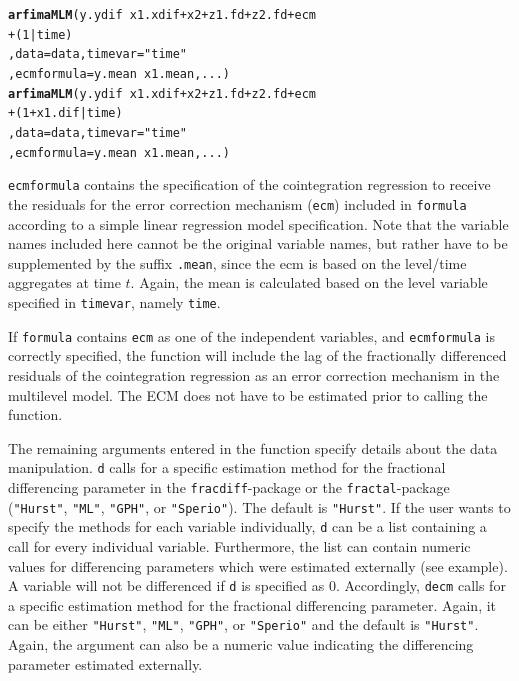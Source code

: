 \documentclass[12pt]{paper}\usepackage[]{graphicx}\usepackage[]{color}
\makeatletter
\newcommand{\hlnum}[1]{\textcolor[rgb]{0.686,0.059,0.569}{#1}}%
\newcommand{\hlstr}[1]{\textcolor[rgb]{0.192,0.494,0.8}{#1}}%
\newcommand{\hlopt}[1]{\textcolor[rgb]{0,0,0}{#1}}%
\newcommand{\hlstd}[1]{\textcolor[rgb]{0.345,0.345,0.345}{#1}}%
\newcommand{\hlkwc}[1]{\textcolor[rgb]{0.333,0.667,0.333}{#1}}%
\newcommand{\hlkwd}[1]{\textcolor[rgb]{0.737,0.353,0.396}{\textbf{#1}}}%
\newenvironment{kframe}{%
 \def\at@end@of@kframe{}%
 \ifinner\ifhmode%
  \def\at@end@of@kframe{\end{minipage}}%
  \begin{minipage}{\columnwidth}%
 \fi\fi%
 \def\FrameCommand##1{\hskip\@totalleftmargin \hskip-\fboxsep
 \colorbox{shadecolor}{##1}\hskip-\fboxsep
     \hskip-\linewidth \hskip-\@totalleftmargin \hskip\columnwidth}%
 \MakeFramed {\advance\hsize-\width
   \@totalleftmargin\z@ \linewidth\hsize
   \@setminipage}}%
 {\par\unskip\endMakeFramed%
 \at@end@of@kframe}
\newenvironment{knitrout}{}{} %
\makeatother
\begin{document}
\begin{knitrout}
\color{fgcolor}\begin{kframe}
\begin{alltt}
\hlkwd{arfimaMLM}\hlstd{(y.ydif} \hlopt{~} \hlstd{x1.xdif} \hlopt{+} \hlstd{x2} \hlopt{+} \hlstd{z1.fd} \hlopt{+} \hlstd{z2.fd} \hlopt{+} \hlstd{ecm}
          \hlopt{+} \hlstd{(}\hlnum{1}\hlopt{|}\hlstd{time)}
          \hlstd{,} \hlkwc{data}\hlstd{=data,} \hlkwc{timevar} \hlstd{=} \hlstr{"time"}
          \hlstd{,} \hlkwc{ecmformula} \hlstd{= y.mean} \hlopt{~} \hlstd{x1.mean, ...)}
\hlkwd{arfimaMLM}\hlstd{(y.ydif} \hlopt{~} \hlstd{x1.xdif} \hlopt{+} \hlstd{x2} \hlopt{+} \hlstd{z1.fd} \hlopt{+} \hlstd{z2.fd} \hlopt{+} \hlstd{ecm}
          \hlopt{+} \hlstd{(}\hlnum{1}\hlopt{+}\hlstd{x1.dif}\hlopt{|}\hlstd{time)}
          \hlstd{,} \hlkwc{data}\hlstd{=data,} \hlkwc{timevar} \hlstd{=} \hlstr{"time"}
          \hlstd{,} \hlkwc{ecmformula} \hlstd{= y.mean} \hlopt{~} \hlstd{x1.mean, ...)}
\end{alltt}
\end{kframe}
\end{knitrout}

\texttt{ecmformula} contains the specification of the cointegration regression to receive the residuals for the error correction mechanism (\texttt{ecm}) included in \texttt{formula} according to a simple linear regression model specification. Note that the variable names included here cannot be the original variable names, but rather have to be supplemented by the suffix \texttt{.mean}, since the ecm is based on the level/time aggregates at time $t$. Again, the mean is calculated based on the level variable specified in \texttt{timevar}, namely \texttt{time}.

If \texttt{formula} contains \texttt{ecm} as one of the independent variables, and \texttt{ecmformula} is correctly specified, the function will include the lag of the fractionally differenced residuals of the cointegration regression as an error correction mechanism in the multilevel model. The ECM does not have to be estimated prior to calling the function.

The remaining arguments entered in the function specify details about the data manipulation. \texttt{d} calls for a specific estimation method for the fractional differencing parameter in the \texttt{fracdiff}-package or the \texttt{fractal}-package (\texttt{"Hurst"}, \texttt{"ML"}, \texttt{"GPH"}, or \texttt{"Sperio"}). The default is \texttt{"Hurst"}. If the user wants to specify the methods for each variable individually, \texttt{d} can be a list containing a call for every individual variable. Furthermore, the list can contain numeric values for differencing parameters which were estimated externally (see example). A variable will not be differenced if \texttt{d} is specified as 0. Accordingly, \texttt{decm} calls for a specific estimation method for the fractional differencing parameter. Again, it can be either \texttt{"Hurst"}, \texttt{"ML"}, \texttt{"GPH"}, or \texttt{"Sperio"} and the default is \texttt{"Hurst"}. Again, the argument can also be a numeric value indicating the differencing parameter estimated externally.
\end{document}
